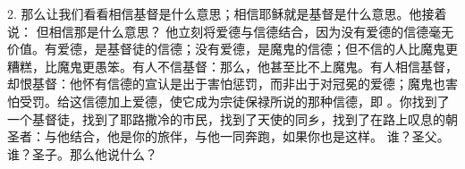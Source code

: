 2. 那么让我们看看相信基督是什么意思；相信耶稣就是基督是什么意思。他接着说： 但相信那是什么意思？ 他立刻将爱德与信德结合，因为没有爱德的信德毫无价值。有爱德，是基督徒的信德；没有爱德，是魔鬼的信德；但不信的人比魔鬼更糟糕，比魔鬼更愚笨。有人不信基督：那么，他甚至比不上魔鬼。有人相信基督，却恨基督：他怀有信德的宣认是出于害怕惩罚，而非出于对冠冕的爱德；魔鬼也害怕受罚。给这信德加上爱德，使它成为宗徒保禄所说的那种信德，即 。你找到了一个基督徒，找到了耶路撒冷的市民，找到了天使的同乡，找到了在路上叹息的朝圣者：与他结合，他是你的旅伴，与他一同奔跑，如果你也是这样。 谁？圣父。谁？圣子。那么他说什么？\par

